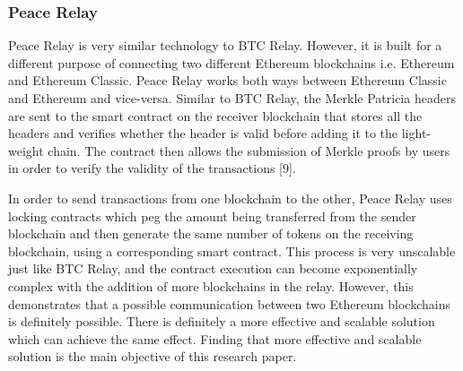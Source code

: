 \documentclass[a4paper,twoside,phd]{BYUPhys}
\begin{document}
\subsubsection{Peace Relay}
Peace Relay is very similar technology to BTC Relay. However, it is built for a different purpose of connecting two different Ethereum blockchains i.e. Ethereum and Ethereum Classic. Peace Relay works both ways between Ethereum Classic and Ethereum and vice-versa. Similar to BTC Relay, the Merkle Patricia headers are sent to the smart contract on the receiver blockchain that stores all the headers and verifies whether the header is valid before adding it
to the light-weight chain. The contract then allows the submission of Merkle proofs by users in order to verify the validity of the transactions [9]. \par
In order to send transactions from one blockchain to the other, Peace Relay uses locking contracts which peg the amount being transferred from the sender blockchain and then generate the same number of tokens on the receiving blockchain, using a corresponding smart contract. This process is very unscalable just like BTC Relay, and the contract execution can become exponentially complex with the addition of more blockchains in the relay. However, this demonstrates that a possible communication between two Ethereum blockchains is definitely possible. There is definitely a more effective and scalable solution which can achieve the same effect. Finding that more effective and scalable solution is the main objective of this research paper.
\end{document}

